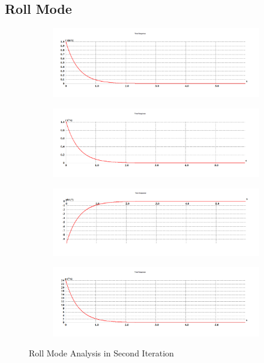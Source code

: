 \subsection{Roll Mode}
\begin{figure}[H]
\begin{subfigure}{0.48\textwidth}
\includegraphics[width = \linewidth]{v__3_.png}
\end{subfigure}
\begin{subfigure}{0.48\textwidth}
\includegraphics[width = \linewidth]{r__3_.png}
\end{subfigure}
\medskip
\begin{subfigure}{0.48\textwidth}
\includegraphics[width = \linewidth]{phi__3_.png}
\end{subfigure}
\begin{subfigure}{0.48\textwidth}
\includegraphics[width = \linewidth]{p__3_.png}
\end{subfigure}
\caption{Roll Mode Analysis in Second Iteration}
\end{figure}
